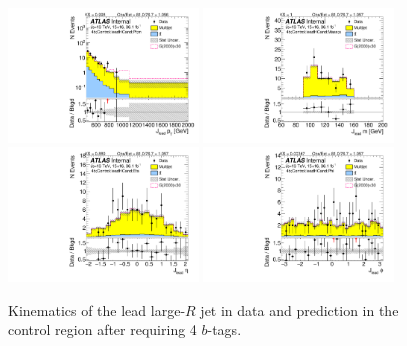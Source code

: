 \begin{figure}[htbp!]
\begin{center}
\includegraphics[angle=270, width=0.45\textwidth]{./figures/boosted/Control/b77_FourTag_Control_leadHCand_Pt_m_1.pdf}
\includegraphics[angle=270, width=0.45\textwidth]{./figures/boosted/Control/b77_FourTag_Control_leadHCand_Mass_s.pdf}\\
\includegraphics[angle=270, width=0.45\textwidth]{./figures/boosted/Control/b77_FourTag_Control_leadHCand_Eta.pdf}
\includegraphics[angle=270, width=0.45\textwidth]{./figures/boosted/Control/b77_FourTag_Control_leadHCand_Phi.pdf}
  \caption{Kinematics of the lead large-$R$ jet in data and prediction in the control region after requiring 4 $b$-tags. }
  \label{fig:boosted-4b-control-ak10-lead}
\end{center}
\end{figure}

